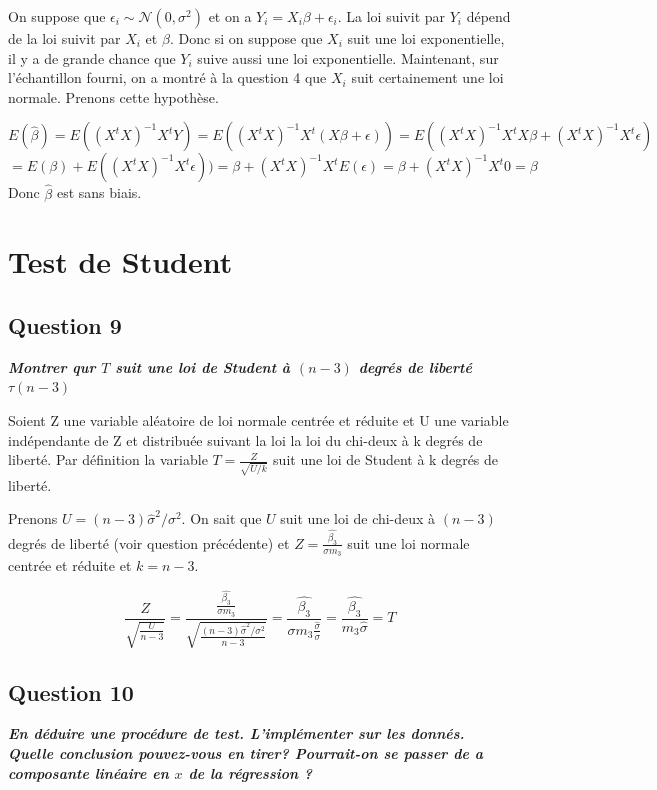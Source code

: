 \documentclass[pdflatex]{article}
\theoremstyle{definition}
\newcommand{\quest}[1]{\textbf{\textit{#1}} \vspace{3mm}}
\begin{document}
On suppose que $\epsilon_i \sim \mathscr{N}(0,\sigma^2)$ et on a $Y_i = X_i\beta + \epsilon_i$. La loi suivit par $Y_i$ d\'epend de la loi suivit par $X_i$ et $\beta$. Donc si on suppose que $X_i$ suit une loi exponentielle, il y a de grande chance que $Y_i$ suive aussi une loi exponentielle.
Maintenant, sur l'\'echantillon fourni, on a montr\'e \`a la question 4 que $X_i$ suit certainement une loi normale.
Prenons cette hypoth\`ese.



$$E(\hat{\beta}) = E((X^tX)^{-1}X^tY) = E((X^tX)^{-1}X^t(X\beta + \epsilon)) = E((X^tX)^{-1}X^tX\beta+ (X^tX)^{-1}X^t\epsilon)
$$
$$
= E(\beta)+ E((X^tX)^{-1}X^t\epsilon)) = \beta + (X^tX)^{-1}X^tE(\epsilon) = \beta + (X^tX)^{-1}X^t0 = \beta
$$
Donc $\hat{\beta}$ est sans biais.

\section*{Test de Student}

\subsection*{Question 9}
\quest{Montrer qur $T$ suit une loi de Student \`a $(n - 3)$ degr\'es de libert\'e $\tau (n - 3)$}

Soient Z une variable al\'eatoire de loi normale centr\'ee et r\'eduite et U une variable ind\'ependante de Z et distribu\'ee suivant la loi la loi du chi-deux \`a k degr\'es de libert\'e. Par d\'efinition la variable $T=\frac {Z}{\sqrt {U/k}}$ suit une loi de Student \`a k degr\'es de libert\'e.

Prenons $U = (n-3)\hat{\sigma}^2/\sigma^2$. On sait que $U$ suit une loi de chi-deux \`a $(n-3)$ degr\'es de libert\'e (voir question pr\'ec\'edente) et $Z = \frac{\hat{\beta_3}}{\sigma m_3}$ suit une loi normale centr\'ee et r\'eduite et $k = n-3$.

$$
\frac{Z}{\sqrt{\frac{U}{n-3}}} = \frac{\frac{\hat{\beta_3}}{\sigma m_3}}{\sqrt{\frac{(n-3)\hat{\sigma}^2/\sigma^2}{n-3}}}
= \frac{\hat{\beta_3}}{\sigma m_3 \frac{\hat{\sigma}}{\sigma}} 
= \frac{\hat{\beta_3}}{m_3 \hat{\sigma}} = T
$$


\subsection*{Question 10}
\quest{En d\'eduire une proc\'edure de test. L'impl\'ementer sur les donn\'es. Quelle conclusion pouvez-vous en tirer? Pourrait-on se passer de a composante lin\'eaire en $x$ de la r\'egression ?}
\end{document}

